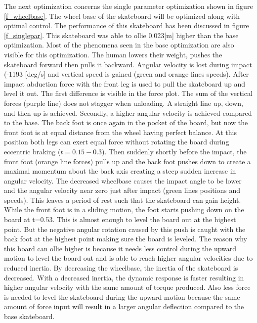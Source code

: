 \noindent The next optimization concerns the single parameter optimization shown in figure \ref{f_wheelbase}. The wheel base of the skateboard will be optimized along with optimal control. The performance of this skateboard has been discussed in figure \ref{f_singlepar}. This skateboard was able to ollie 0.023[m] higher than the base optimization. Most of the phenomena seen in the base optimization are also visible for this optimization. The human lowers their weight, pushes the skateboard forward then pulls it backward. Angular velocity is lost during impact (-1193 [deg/s] and vertical speed is gained (green and orange lines speeds). After impact abduction force with the front leg is used to pull the skateboard up and level it out. The first difference is visible in the force plot. The sum of the vertical forces (purple line) does not stagger when unloading. A straight line up, down, and then up is achieved. Secondly, a higher angular velocity is achieved compared to the base. The back foot is once again in the pocket of the board, but now the front foot is at equal distance from the wheel having perfect balance. At this position both legs can exert equal force without rotating the board during eccentric braking ($t=0.15 - 0.3$). Then suddenly shortly before the impact, the front foot (orange line forces) pulls up and the back foot pushes down to create a maximal momentum about the back axis creating a steep sudden increase in angular velocity. The decreased wheelbase causes the impact angle to be lower and the angular velocity near zero just after impact (green lines positions and speeds). This leaves a period of rest such that the skateboard can gain height. While the front foot is in a sliding motion, the foot starts pushing down on the board at t=0.53.  This is almost enough to level the board out at the highest point. But the negative angular rotation caused by this push is caught with the back foot at the highest point making sure the board is leveled. 
The reason why this board can ollie higher is because it needs less control during the upward motion to level the board out and is able to reach higher angular velocities due to reduced inertia. By decreasing the wheelbase, the inertia of the skateboard is decreased. With a decreased inertia, the dynamic response is faster resulting in higher angular velocity with the same amount of torque produced. Also less force is needed to level the skateboard during the upward motion because the same amount of force input will result in a larger angular deflection compared to the base skateboard. 

